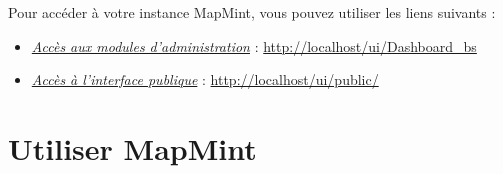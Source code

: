 \documentclass[letterpaper,10pt,french]{sphinxmanual}
\begin{document}
Pour accéder à votre instance MapMint, vous pouvez utiliser les liens
suivants :
\begin{itemize}
\item {} 
{\hyperref[introduction/usemapmint:introduction-usemapmint-administration-access]{\emph{Accès aux modules d'administration}}} : \href{http://localhost/ui/Dashboard\_bs}{http://localhost/ui/Dashboard\_bs}

\item {} 
{\hyperref[introduction/usemapmint:introduction-usemapmint-public-access]{\emph{Accès à l'interface publique}}} : \href{http://localhost/ui/public/}{http://localhost/ui/public/}

\end{itemize}


\section{Utiliser MapMint}
\end{document}
